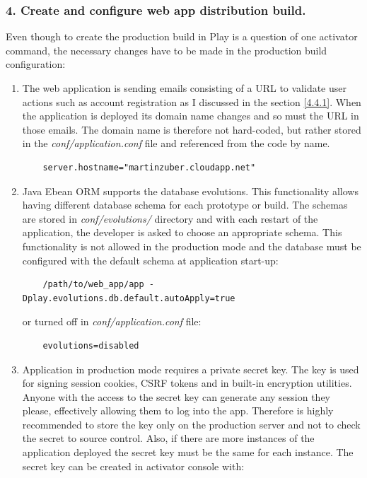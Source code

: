 \documentclass[12pt,twoside,a4paper]{report}
\begin{document}
\subsubsection{4. Create and configure web app distribution build.}
Even though to create the production build in Play is a question of one activator command, the necessary changes have to be made in the production build configuration:
\begin{enumerate}\itemsep1pt \parskip0pt 
\item The web application is sending emails consisting of a URL to validate user actions such as account registration as I discussed in the section \ref{4.4.1}. When the application is deployed its domain name changes and so must the URL in those emails. The domain name is therefore not hard-coded, but rather stored in the \emph{conf/application.conf} file and referenced from the code by name.
\begin{lstlisting} 
	server.hostname="martinzuber.cloudapp.net"
\end{lstlisting} 
\item Java Ebean ORM supports the database evolutions. This functionality allows having different database schema for each prototype or build. The schemas are stored in \emph{conf/evolutions/} directory and with each restart of the application, the developer is asked to choose an appropriate schema. This functionality is not allowed in the production mode and the database must be configured with the default schema at application start-up:
\begin{lstlisting} 
	/path/to/web_app/app -Dplay.evolutions.db.default.autoApply=true
\end{lstlisting} 
or turned off in \emph{conf/application.conf} file:
\begin{lstlisting} 
	evolutions=disabled
\end{lstlisting} 
\item Application in production mode requires a private secret key. The key is used for signing session cookies, CSRF tokens and in built-in encryption utilities. Anyone with the access to the secret key can generate any session they please, effectively allowing them to log into the app. Therefore is highly recommended to store the key only on the production server and not to check the secret to source control. Also, if there are more instances of the application deployed the secret key must be the same for each instance. The secret key can be created in activator console with:
\begin{lstlisting} 

\end{lstlisting}
\end{enumerate}
\end{document}
